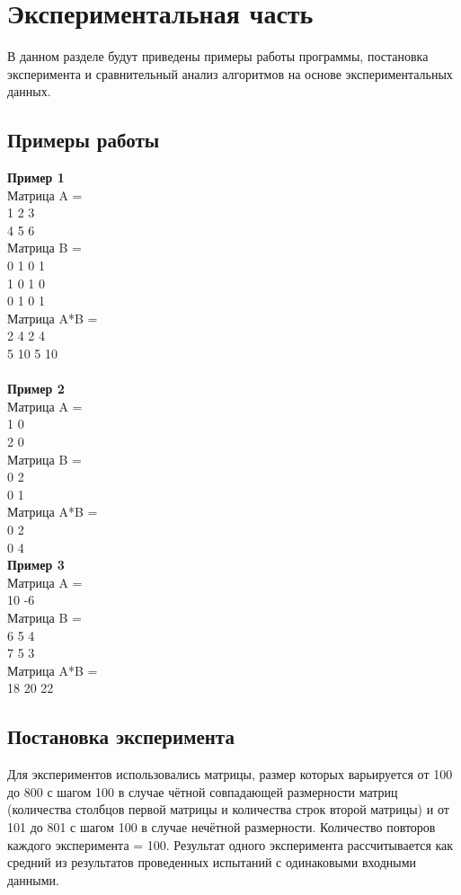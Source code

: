 \documentclass[a4paper, 14pt]{article}
\begin{document}
	
	


    \newpage
	\section{Экспериментальная часть}
	\hspace{1cm}В данном разделе будут приведены примеры работы программы, постановка эксперимента и сравнительный анализ алгоритмов на основе экспериментальных данных.
	\subsection{Примеры работы}
	\textbf {Пример 1}\\
	Матрица A = \\
	1 2 3\\
    4 5 6\\
    
    Матрица B = \\
	0 1 0 1\\
    1 0 1 0\\
    0 1 0 1\\
    
    Матрица A*B = \\
	2 4  2 4\\
    5 10 5 10\\\\
    \textbf {Пример 2}\\
	Матрица A = \\
	1 0\\
    2 0\\
    Матрица B = \\
	0 2\\
    0 1\\
    Матрица A*B = \\
	0 2\\
    0 4\\
    
    \newpage
    \textbf {Пример 3}\\
	Матрица A = \\
	10 -6\\
    Матрица B = \\
	6 5 4\\
    7 5 3\\
    Матрица A*B = \\
	18 20 22\\

    
    \subsection{Постановка эксперимента}
    \hspace{1cm}Для экспериментов использовались матрицы, размер которых варьируется от 100 до 800 с шагом 100 в случае чётной совпадающей размерности матриц (количества столбцов первой матрицы и количества строк второй матрицы) и от 101 до 801 с шагом 100 в случае нечётной размерности. 
    Количество повторов каждого эксперимента = 100. Результат одного эксперимента рассчитывается как
    средний из результатов проведенных испытаний с одинаковыми входными данными.
    
\end{document}
